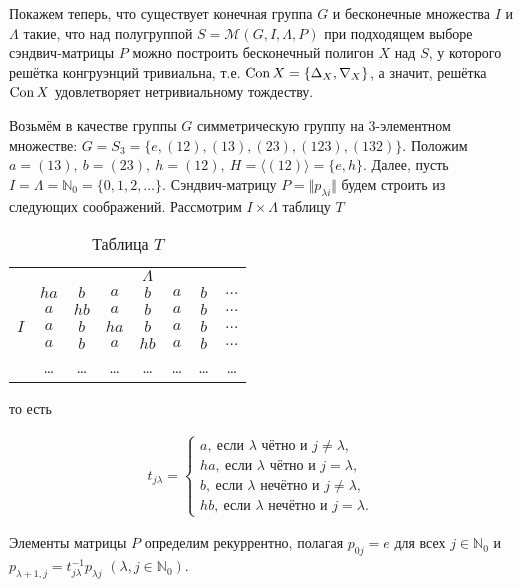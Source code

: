 \documentclass[a4paper]{article}
\newcommand{\Con}{\textnormal{Con}\, }
\begin{document}
	\par Покажем теперь, что существует конечная группа $G$ и бесконечные множества $I$ и $\Lambda$ такие, что над полугруппой $S = \mathcal{M}(G,I,\Lambda,P)$ при подходящем выборе сэндвич-матрицы $P$ можно построить бесконечный полигон $X$ над $S$, у которого решётка конгруэнций тривиальна, т.е. $\Con X = \{\Delta_X, \nabla_X\}$, а значит, решётка $\Con X$ удовлетворяет нетривиальному тождеству.
	\par Возьмём в качестве группы $G$ симметрическую группу на 3-элементном множестве: $G = S_3 = \{e,(12),(13),(23),(123),(132)\}$. Положим $a = (13),\ b = (23),\ h = (12),\ H = \langle (12) \rangle = \{e,h\}$. Далее, пусть $I = \Lambda = \mathbb{N}_0 = \{0,1,2,\ldots \}$. Сэндвич-матрицу $P = \Vert p_{\lambda i} \Vert$ будем строить из следующих соображений. Рассмотрим $I \times \Lambda$ таблицу $T$
	\begin{table}[h]
		\begin{center}
			\begin{tabular}{cccccccc}
					&  & & & $\Lambda$ & \\
					& $ha$ & $b$ & $a$ & $b$ & $a$ & $b$ & $\dots$ \\
					& $a$ & $hb$ & $a$ & $b$ & $a$ & $b$ & $\dots$ \\
				$I$	& $a$ & $b$ & $ha$ & $b$ & $a$ & $b$ & $\dots$ \\
					& $a$ & $b$ & $a$ & $hb$ & $a$ & $b$ & $\dots$ \\
					& \ldots & \ldots & \ldots & \ldots & \ldots & \ldots & \ldots
			\end{tabular}
			\caption{Таблица $T$} \label{table1} 
		\end{center}
		то есть
	\end{table}
	\begin{gather*}
		t_{j \lambda} = 
		\begin{cases}
			a,\ \text{если $\lambda$ чётно и } j \neq \lambda,\\
			ha,\ \text{если $\lambda$ чётно и } j = \lambda,\\
			b,\ \text{если $\lambda$ нечётно и } j \neq \lambda,\\
			hb,\ \text{если $\lambda$ нечётно и } j = \lambda.
		\end{cases}
	\end{gather*}
	\par Элементы матрицы $P$ определим рекуррентно, полагая $p_{0j} = e$ для всех $j \in \mathbb{N}_0$ и $p_{\lambda + 1,j} = t_{j \lambda}^{-1} p_{\lambda j}$ $(\lambda,j \in \mathbb{N}_0)$.
\end{document}
